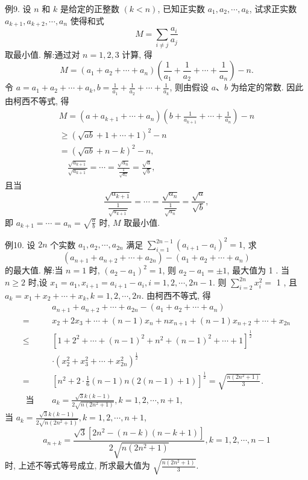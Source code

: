 例9. 设 $n$ 和 $k$ 是给定的正整数 $(k<n)$, 已知正实数 $a_1, a_2, \cdots, a_k$, 试求正实数 $a_{k+1}, a_{k+2}, \cdots, a_n$ 使得和式
$$
M=\sum_{i \neq j} \frac{a_i}{a_j}
$$
取最小值.
解:通过对 $n=1,2,3$ 计算, 得
$$
M=\left(a_1+a_2+\cdots+a_n\right)\left(\frac{1}{a_1}+\frac{1}{a_2}+\cdots+\frac{1}{a_n}\right)-n .
$$
令 $a=a_1+a_2+\cdots+a_k, b=\frac{1}{a_1}+\frac{1}{a_2}+\cdots+\frac{1}{a_k}$, 则由假设 $a 、 b$ 为给定的常数.
因此由柯西不等式, 得
$$
\begin{gathered}
M=\left(a+a_{k+1}+\cdots+a_n\right)\left(b+\frac{1}{a_{k+1}}+\cdots+\frac{1}{a_n}\right)-n \\
\geqslant(\sqrt{a b}+1+\cdots+1)^2-n \\
=(\sqrt{a b}+n-k)^2-n, \\
\quad \frac{\sqrt{a_{k+1}}}{\sqrt{a_{k+1}}}=\cdots=\frac{\sqrt{a_n}}{\frac{1}{\sqrt{a_n}}}=\frac{\sqrt{a}}{\sqrt{b}},
\end{gathered}
$$
且当
$$
\frac{\sqrt{a_{k+1}}}{\frac{1}{\sqrt{a_{k+1}}}}=\cdots=\frac{\sqrt{a_n}}{\frac{1}{\sqrt{a_n}}}=\frac{\sqrt{a}}{\sqrt{b}},
$$
即 $a_{k+1}=\cdots=a_n=\sqrt{\frac{a}{b}}$ 时, $M$ 取最小值.



例10. 设 $2 n$ 个实数 $a_1, a_2, \cdots, a_{2 n}$ 满足 $\sum_{i=1}^{2 n-1}\left(a_{i+1}-a_i\right)^2=1$, 求
$$
\left(a_{n+1}+a_{n+2}+\cdots+a_{2 n}\right)-\left(a_1+a_2+\cdots+a_n\right)
$$
的最大值.
解:当 $n=1$ 时, $\left(a_2-a_1\right)^2=1$, 则 $a_2-a_1= \pm 1$, 最大值为 1 .
当 $n \geqslant 2$ 时,设 $x_1=a_1, x_{i+1}=a_{i+1}-a_i, i=1,2, \cdots, 2 n-1$. 则 $\sum_{i=2}^{2 n} x_i^2=$ 1 , 且 $a_k=x_1+x_2+\cdots+x_k, k=1,2, \cdots, 2 n$.
由柯西不等式, 得
$$
\begin{aligned}
& a_{n+1}+a_{n+2}+\cdots+a_{2 n}-\left(a_1+a_2+\cdots+a_n\right) \\
= & x_2+2 x_3+\cdots+(n-1) x_n+n x_{n+1}+(n-1) x_{n+2}+\cdots+x_{2 n} \\
\leqslant & {\left[1+2^2+\cdots+(n-1)^2+n^2+(n-1)^2+\cdots+1\right]^{\frac{1}{2}} } \\
& \cdot\left(x_2^2+x_3^2+\cdots+x_{2 n}^2\right)^{\frac{1}{2}} \\
= & {\left[n^2+2 \cdot \frac{1}{6}(n-1) n(2(n-1)+1)\right]^{\frac{1}{2}}=\sqrt{\frac{n\left(2 n^2+1\right)}{3}} . } \\
\text { 当 } \quad & a_k=\frac{\sqrt{3} k(k-1)}{2 \sqrt{n\left(2 n^2+1\right)}}, k=1,2, \cdots, n+1,
\end{aligned}
$$
当 $a_k=\frac{\sqrt{3} k(k-1)}{2 \sqrt{n\left(2 n^2+1\right)}}, k=1,2, \cdots, n+1$,
$$
a_{n+k}=\frac{\sqrt{3}\left[2 n^2-(n-k)(n-k+1)\right]}{2 \sqrt{n\left(2 n^2+1\right)}}, k=1,2, \cdots, n-1
$$
时, 上述不等式等号成立, 所求最大值为 $\sqrt{\frac{n\left(2 n^2+1\right)}{3}}$.



